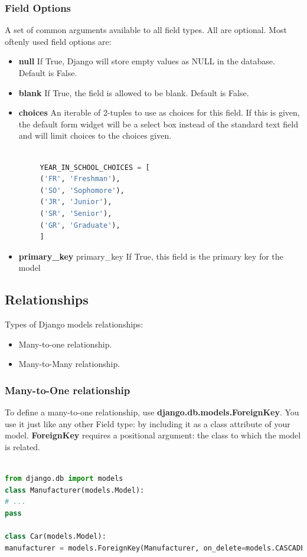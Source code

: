 \subsubsection{Field Options}
A set of common arguments available to all field types. All are optional. Most oftenly used field options are:
\begin{itemize}
	\item \textbf{null} If True, Django will store empty values as NULL in the database. Default is False.
	\item \textbf{blank} If True, the field is allowed to be blank. Default is False.
	\item \textbf{choices} An iterable of 2-tuples to use as choices for this field. If this is given, the default form widget will be a select box instead of the standard text field and will limit choices to the choices given.
	\begin{lstlisting}[language=python,numbers=none]
	 
	 YEAR_IN_SCHOOL_CHOICES = [
	 ('FR', 'Freshman'),
	 ('SO', 'Sophomore'),
	 ('JR', 'Junior'),
	 ('SR', 'Senior'),
	 ('GR', 'Graduate'),
	 ]
	\end{lstlisting}
	\item \textbf{primary\_key} primary\_key If True, this field is the primary key for the model
\end{itemize}
\newpage
\subsection{Relationships}
Types of Django models relationships:
\begin{itemize}
	\item Many-to-one relationship.
	\item Many-to-Many relationship.
\end{itemize}
\subsubsection{Many-to-One relationship}
To define a many-to-one relationship, use \textbf{django.db.models.ForeignKey}. You use it just like any other Field type: by including it as a class attribute of your model.
\textbf{ForeignKey} requires a positional argument: the class to which the model is related.
\begin{lstlisting}[language=python,numbers=none]

from django.db import models
class Manufacturer(models.Model):
# ...
pass

class Car(models.Model):
manufacturer = models.ForeignKey(Manufacturer, on_delete=models.CASCADE)  
\end{lstlisting}

